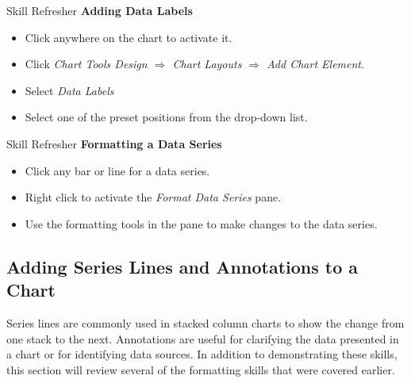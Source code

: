 \begin{center}
	\begin{sklbox}{Skill Refresher}
		\textbf{Adding Data Labels}
		\\
		\begin{itemize}
			\setlength{\itemsep}{0pt}
			\setlength{\parskip}{0pt}
			\setlength{\parsep}{0pt}

			\item Click anywhere on the chart to activate it.
			\item Click \textit{Chart Tools Design $ \Rightarrow $ Chart Layouts $ \Rightarrow $ Add Chart Element}.
			\item Select \textit{Data Labels}
			\item Select one of the preset positions from the drop-down list.
			
		\end{itemize}
	\end{sklbox}
\end{center}

\begin{center}
	\begin{sklbox}{Skill Refresher}
		\textbf{Formatting a Data Series}
		\\
		\begin{itemize}
			\setlength{\itemsep}{0pt}
			\setlength{\parskip}{0pt}
			\setlength{\parsep}{0pt}
			
			\item Click any bar or line for a data series.
			\item Right click to activate the \textit{Format Data Series} pane.
			\item Use the formatting tools in the pane to make changes to the data series.
			
		\end{itemize}
	\end{sklbox}
\end{center}

\subsection{Adding Series Lines and Annotations to a Chart}

Series lines are commonly used in stacked column charts to show the change from one stack to the next. Annotations are useful for clarifying the data presented in a chart or for identifying data sources. In addition to demonstrating these skills, this section will review several of the formatting skills that were covered earlier. 

